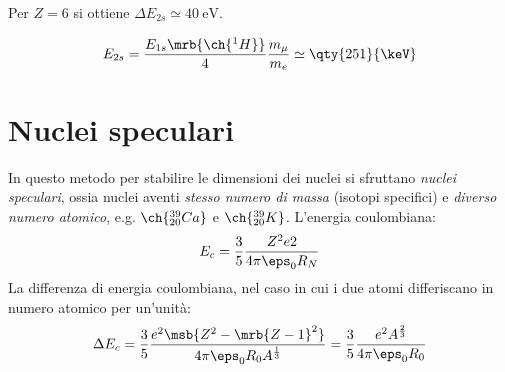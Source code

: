 \begin{note}[]
  Per $Z = 6$ si ottiene $\Delta E _{2s} \simeq \qty{40}{\eV}$.
\end{note}

\begin{equation}
  E _{2s}
  = \frac{E _{1s} \mrb{\ch{^{1} H}}}{4} \frac{m _{\mu}}{m_e}
  \simeq \qty{251}{\keV}
\end{equation}

\section{Nuclei speculari}
In questo metodo per stabilire le dimensioni dei nuclei
si sfruttano \textit{nuclei speculari}, ossia nuclei aventi
\textit{stesso numero di massa} (isotopi specifici) e
\textit{diverso numero atomico}, e.g.
$\ch{^{39}_{20}Ca}$ e $\ch{^{39}_{20}K}$.
L'energia coulombiana:
\begin{equation}
  E_c = \frac{3}{5} \frac{Z^2 e2}{4 \pi \eps_0 R_N}
\end{equation}
La differenza di energia coulombiana, nel caso in cui i due atomi differiscano
in numero atomico per un'unità:
\begin{equation}
  \Delta E_c
  = \frac{3}{5} \frac{e^2 \msb{Z^2 - \mrb{Z - 1}^{2}}}{4 \pi \eps_0
  R_0 A ^{\frac{1}{3}}}
  = \frac{3}{5} \frac{e^2 A ^{\frac{2}{3}}}{4 \pi \eps_0 R_0}
\end{equation}
